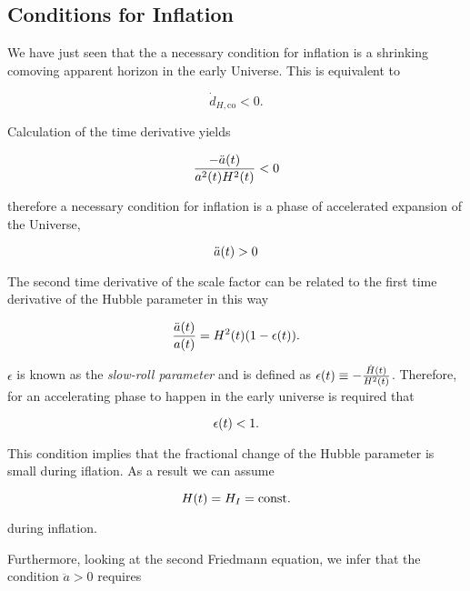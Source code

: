 \subsection{Conditions for Inflation}

We have just seen that the a necessary condition for inflation is a
shrinking comoving apparent horizon in the early Universe. This is
equivalent to

\begin{equation}
        \dot d_{H,\text{co}} < 0.
\end{equation}

Calculation of the time derivative yields

\begin{equation}
        \frac{-\ddot a\qty(t)}{a^2\qty(t) H^2\qty(t)} < 0
\end{equation}

therefore a necessary condition for inflation is a phase of accelerated
expansion of the Universe,

\begin{equation}
        \ddot a\qty(t) > 0
\end{equation}

The second time derivative of the scale factor can be related to the first
time derivative of the Hubble parameter in this way

\begin{equation}
        \frac{\ddot a\qty(t)}{a\qty(t)} = H^2\qty(t)\qty(1 - \epsilon\qty(t)).
\end{equation}

$\epsilon$ is known as the \emph{slow-roll parameter} and is defined as
$\epsilon\qty(t) \equiv -\frac{\dot H\qty(t)}{H^2\qty(t)}$.
Therefore, for an accelerating phase to happen in the early universe is
required that

\begin{equation}
        \epsilon\qty(t) < 1.
\end{equation}

This condition implies that the fractional change of the Hubble parameter
is small during iflation. As a result we can assume

\begin{equation}
        H\qty(t) = H_I = \text{const.}
\end{equation}

during inflation.

Furthermore, looking at the second Friedmann equation, we infer that the condition $\ddot
a > 0$ requires

